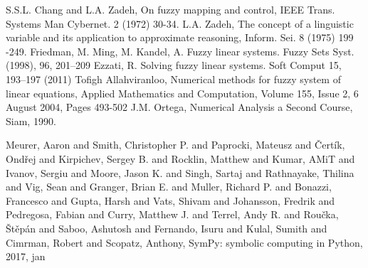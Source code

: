 	\setLTRbibitems
	\begin{thebibliography}{9}
	S.S.L. Chang and L.A. Zadeh, On fuzzy mapping and
	control, IEEE Trans. Systems Man Cybernet. 2 (1972)
	30-34.
	L.A. Zadeh, The concept of a linguistic variable and its
	application to approximate reasoning, Inform. Sei. 8 (1975)
	199 -249.
	Friedman, M. Ming, M. Kandel, A. Fuzzy linear systems. Fuzzy Sets Syst. (1998), 96, 201–209
	Ezzati, R. Solving fuzzy linear systems. Soft Comput 15, 193–197 (2011)
	Tofigh Allahviranloo, Numerical methods for fuzzy system of linear equations, Applied Mathematics and Computation, Volume 155, Issue 2, 6 August 2004, Pages 493-502
	J.M. Ortega, Numerical Analysis a Second Course, Siam, 1990.
	
	
	Meurer, Aaron and Smith, Christopher P. and Paprocki, Mateusz and \v{C}ert\'{i}k, Ond\v{r}ej and Kirpichev, Sergey B. and Rocklin, Matthew and Kumar, AMiT and Ivanov, Sergiu and Moore, Jason K. and Singh, Sartaj and Rathnayake, Thilina and Vig, Sean and Granger, Brian E. and Muller, Richard P. and Bonazzi, Francesco and Gupta, Harsh and Vats, Shivam and Johansson, Fredrik and Pedregosa, Fabian and Curry, Matthew J. and Terrel, Andy R. and Rou\v{c}ka, \v{S}t\v{e}p\'{a}n and Saboo, Ashutosh and Fernando, Isuru and Kulal, Sumith and Cimrman, Robert and Scopatz, Anthony, SymPy: symbolic computing in Python, 2017, jan
	
	\end{thebibliography}